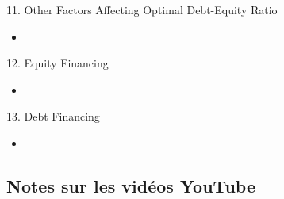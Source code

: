 \begin{CHPT_SUMM_AUTO}[label = {L.-11}]{11. Other Factors Affecting Optimal Debt-Equity Ratio}
	\begin{itemize}
		\item	
	\end{itemize}
\end{CHPT_SUMM_AUTO}

\begin{CHPT_SUMM_AUTO}[label = {L.-12}]{12. Equity Financing}
	\begin{itemize}
		\item	
	\end{itemize}
\end{CHPT_SUMM_AUTO}

\begin{CHPT_SUMM_AUTO}[label = {L.-13}]{13. Debt Financing}
	\begin{itemize}
		\item	
	\end{itemize}
\end{CHPT_SUMM_AUTO}

\subsection{Notes sur les vidéos YouTube}

